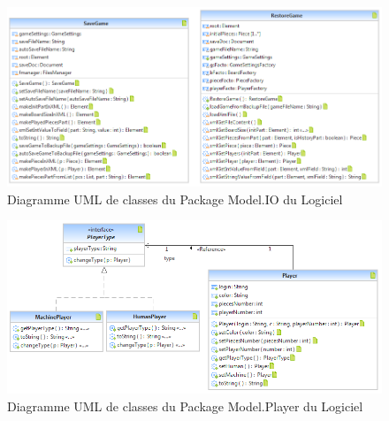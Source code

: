 \documentclass[a4paper,12pt]{report}
\begin{document}
\label{OthKerModelIO}
\begin{figure}[H]
\centering
  \includegraphics[scale=0.65]{Kernel/Pack_com_model_io.png}
\caption{Diagramme UML de classes du Package Model.IO du Logiciel}
\end{figure}

\label{OthKerModelPlayer}
\begin{figure}[H]
\centering
 \includegraphics[scale=0.7]{Kernel/Pack_com_model_player.png}
\caption{Diagramme UML de classes du Package Model.Player du Logiciel}
\end{figure}
\end{document}
